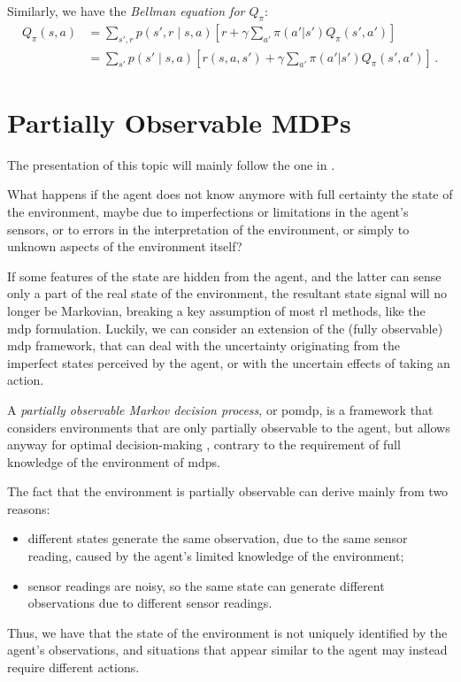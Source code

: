 Similarly, we have the \emph{Bellman equation for $Q_\pi$}:
\begin{equation}
    \begin{aligned}
        Q_\pi (s, a)
        &= \sum_{s', r} p(s', r \mid s, a) \left[ r + \gamma \sum_{a'} \pi(a'|s')  Q_\pi (s', a') \right] \\
        &= \sum_{s'} p(s' \mid s, a) \left[ r(s,a,s') + \gamma \sum_{a'} \pi(a'|s')  Q_\pi (s', a') \right] \, .
    \end{aligned}
    \label{eq:Q-recursive}
\end{equation}


\section{Partially Observable MDPs}

The presentation of this topic will mainly follow the one in \cite{Spaan12pomdp}.

What happens if the agent does not know anymore with full certainty the state of the environment, maybe due to imperfections or limitations in the agent's sensors, or to errors in the interpretation of the environment, or simply to unknown aspects of the environment itself?

If some features of the state are hidden from the agent, and the latter can sense only a part of the real state of the environment, the resultant state signal will no longer be Markovian, breaking a key assumption of most \acrshort{rl} methods, like the \acrshort{mdp} formulation. Luckily, we can consider an extension of the (fully observable) \acrshort{mdp} framework, that can deal with the uncertainty originating from the imperfect states perceived by the agent, or with the uncertain effects of taking an action.

A \emph{partially observable Markov decision process}, or \acrshort{pomdp}, is a framework that considers environments that are only partially observable to the agent, but allows anyway for optimal decision-making \cite{Kaelbling1998}, contrary to the requirement of full knowledge of the environment of \acrshort{mdp}s.

The fact that the environment is partially observable can derive mainly from two reasons:
\begin{itemize}
    \item different states generate the same observation, due to the same sensor reading, caused by the agent's limited knowledge of the environment;
    \item sensor readings are noisy, so the same state can generate different observations due to different sensor readings.
\end{itemize}
Thus, we have that the state of the environment is not uniquely identified by the agent's observations, and situations that appear similar to the agent may instead require different actions.

